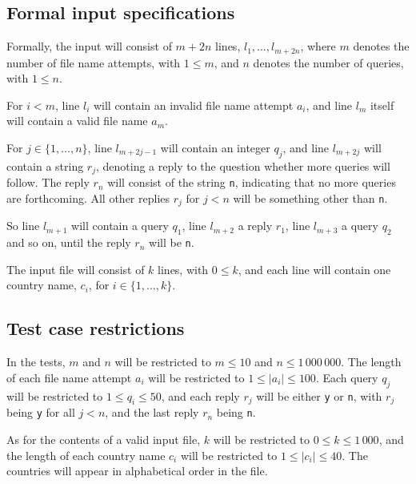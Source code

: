 \subsection*{Formal input specifications}
Formally, the input will consist of $m + 2n$ lines,
$l_1, \dots, l_{m+2n}$,
where $m$ denotes the number of file name attempts, with $1 \le m$,
and $n$ denotes the number of queries, with $1 \le n$.

For $i < m$, line $l_i$ will contain an invalid file name attempt $a_i$,
and line $l_m$ itself will contain a valid file name $a_m$.

For $j \in \{1, \dots, n\}$,
line $l_{m + 2j - 1}$ will contain an integer $q_j$,
and line $l_{m + 2j}$ will contain a string $r_j$,
denoting a reply to the question whether more queries will follow.
The reply $r_n$ will consist of the string \texttt{n},
indicating that no more queries are forthcoming.
All other replies $r_j$ for $j < n$
will be something other than \texttt{n}.

So line $l_{m + 1}$ will contain a query $q_1$,
line $l_{m + 2}$ a reply $r_1$,
line $l_{m + 3}$ a query $q_2$ and so on,
until the reply $r_n$ will be \texttt{n}.

The input file will consist of $k$ lines, with $0 \le k$,
and each line will contain one country name, $c_i$,
for $i \in \{1, \dots, k\}$.

\subsection*{Test case restrictions}
In the tests, $m$ and $n$ will be restricted to
$m \le 10$ and $n \le 1\,000\,000$.
The length of each file name attempt $a_i$
will be restricted to $1 \le |a_i| \le 100$.
Each query $q_j$ will be restricted to $1 \le q_i \le 50$,
and each reply $r_j$ will be either \texttt{y} or \texttt{n},
with $r_j$ being \texttt{y} for all $j < n$,
and the last reply $r_n$ being \texttt{n}.

As for the contents of a valid input file,
$k$ will be restricted to $0 \le k \le 1\,000$,
and the length of each country name $c_i$
will be restricted to $1 \le |c_i| \le 40$.
The countries will appear in alphabetical order in the file.


